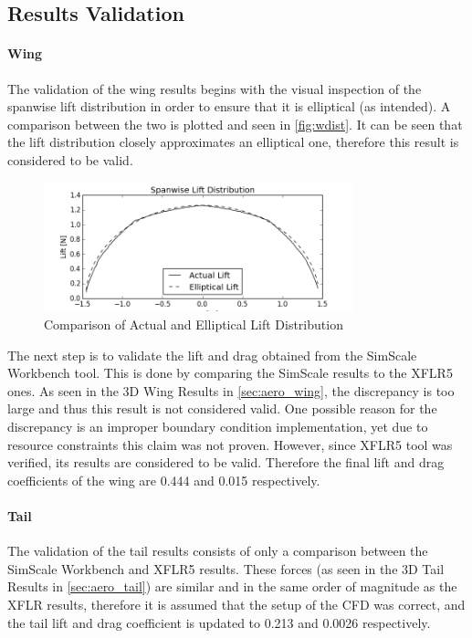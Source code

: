 \subsection{Results Validation}
\label{sub:vval}

\paragraph{Wing} The validation of the wing results begins with the visual inspection of the spanwise lift distribution in order to ensure that it is elliptical (as intended). A comparison between the two is plotted and seen in \autoref{fig:wdist}. It can be seen that the lift distribution closely approximates an elliptical one, therefore this result is considered to be valid.

\begin{figure}[H]
    \centering
    \includegraphics[width=0.8\textwidth]{Aerodynamics/Figures/wdist}
    \caption{Comparison of Actual and Elliptical Lift Distribution}
    \label{fig:wdist}
\end{figure}

The next step is to validate the lift and drag obtained from the SimScale Workbench tool. This is done by comparing the SimScale results to the XFLR5 ones. As seen in the 3D Wing Results in \autoref{sec:aero_wing}, the discrepancy is too large and thus this result is not considered valid. One possible reason for the discrepancy is an improper boundary condition implementation, yet due to resource constraints this claim was not proven. However, since XFLR5 tool was verified, its results are considered to be valid. Therefore the final lift and drag coefficients of the wing are 0.444 and 0.015 respectively.

\paragraph{Tail} The validation of the tail results consists of only a comparison between the SimScale Workbench and XFLR5 results. These forces (as seen in the 3D Tail Results in \autoref{sec:aero_tail}) are similar and in the same order of magnitude as the XFLR results, therefore it is assumed that the setup of the CFD was correct, and the tail lift and drag coefficient is updated to 0.213 and 0.0026 respectively.

